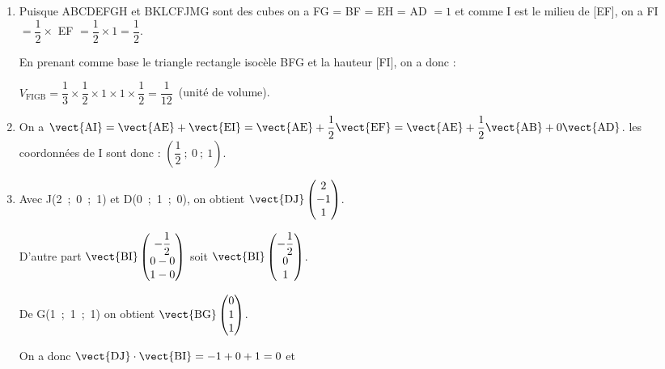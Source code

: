 \begin{enumerate}
\item %


Puisque ABCDEFGH et BKLCFJMG sont des cubes on a FG = BF = EH = AD $ = 1$ et comme I est le milieu de [EF], on a FI $= \dfrac12 \times $ EF $ = \dfrac12 \times 1 = \dfrac12$.

En prenant comme base le triangle rectangle isocèle BFG et la hauteur [FI], on a donc :

$V_{\text{FIGB}} = \dfrac13 \times \dfrac12 \times 1 \times 1 \times \dfrac12 = \dfrac{1}{12}$~(unité de volume).
\item %
On a $\vect{\text{AI}} = \vect{\text{AE}} + \vect{\text{EI}} = \vect{\text{AE}} + \dfrac12\vect{\text{EF}} = \vect{\text{AE}} + \dfrac12\vect{\text{AB}} + 0\vect{\text{AD}}$. les coordonnées de I sont donc : $\left(\dfrac12~;~0~;~1\right)$.
\item %
Avec J(2~;~0~;~1) et D(0~;~1~;~0), on obtient $\vect{\text{DJ}}\begin{pmatrix}2\\-1\\1\end{pmatrix}$.

D'autre part $\vect{\text{BI}}\begin{pmatrix}- \dfrac12\\0 - 0\\1 - 0 \end{pmatrix}$ soit $\vect{\text{BI}}\begin{pmatrix}- \dfrac12\\0 \\1\end{pmatrix}$.

De G(1~;~1~;~1) on obtient $\vect{\text{BG}}\begin{pmatrix}0\\1\\1\end{pmatrix}$.

On a donc $\vect{\text{DJ}}\cdot \vect{\text{BI}} = -1 + 0 + 1 = 0$ et 


\end{enumerate}
